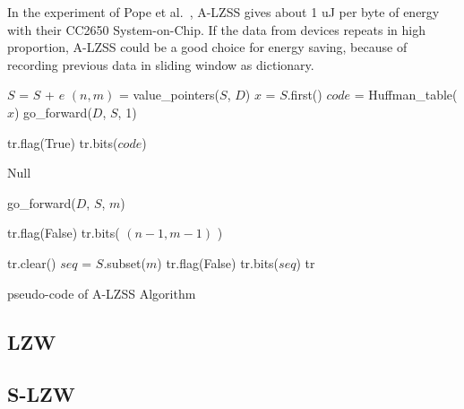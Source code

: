 In the experiment of Pope et al.~\cite{pope2018accelerometer}, A-LZSS gives
about 1 uJ per byte of energy with their CC2650 System-on-Chip. If the data from
devices repeats in high proportion, A-LZSS could be a good choice for energy
saving, because of recording previous data in sliding window as dictionary.
\begin{algorithm}
\begin{algorithmic}[1]
\Input
\EndInput
\Output
\EndOutput

\State $S$ = $S$ + $e$  
\State $(n, m)$ = value\_pointers($S$, $D$)  
    \State $x$ = $S$.first()    
    \State $code$ = Huffman\_table($x$)
    \State go\_forward($D$, $S$, 1) 
    
    \State tr.flag(True)    
    \State tr.bits($code$)  
    
   
    \State \Return Null
    
\Else                       {}
    \State go\_forward($D$, $S$, $m$) 
    
    \State tr.flag(False)
    \State tr.bits( $(n-1, m-1)$ )  
\EndIf

 
    \State tr.clear()
    \State $seq$ = $S$.subset($m$) 
    \State tr.flag(False)
    \State tr.bits($seq$)   
\EndIf
\State \Return tr

\end{algorithmic}
\caption{pseudo-code of A-LZSS Algorithm}
\label{algo:A-LZSS}
\end{algorithm}

\subsection{LZW}
\subsection{S-LZW}

